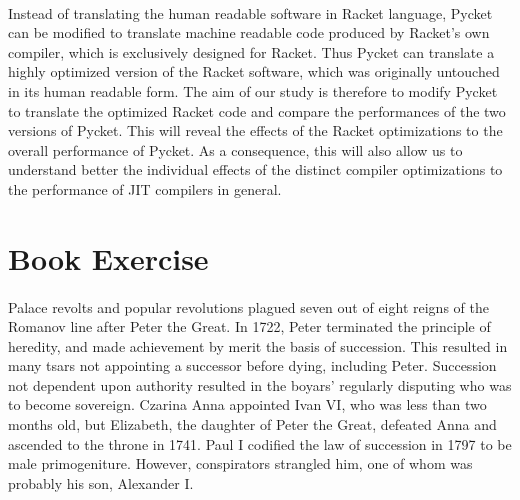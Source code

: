 \documentclass{article}
\begin{document}
\paragraph{} Instead of translating the human readable software in Racket language,
Pycket can be modified to translate machine readable code produced by
Racket's own compiler, which is exclusively designed for Racket. Thus
Pycket can translate a highly optimized version of the Racket
software, which was originally untouched in its human readable
form. The aim of our study is therefore to modify Pycket to translate
the optimized Racket code and compare the performances of the two
versions of Pycket. This will reveal the effects of the Racket
optimizations to the overall performance of Pycket. As a consequence,
this will also allow us to understand better the individual effects of
the distinct compiler optimizations to the performance of JIT
compilers in general.

\section{Book Exercise}

\paragraph{} Palace revolts and popular revolutions plagued seven out of eight
reigns of the Romanov line after Peter the Great. In 1722, Peter
terminated the principle of heredity, and made achievement by merit
the basis of succession. This resulted in many tsars not appointing a
successor before dying, including Peter. Succession not dependent upon
authority resulted in the boyars' regularly disputing who was to
become sovereign. Czarina Anna appointed Ivan VI, who was less than
two months old, but Elizabeth, the daughter of Peter the Great,
defeated Anna and ascended to the throne in 1741. Paul I codified the
law of succession in 1797 to be male primogeniture. However,
conspirators strangled him, one of whom was probably his son,
Alexander I.



\end{document}
